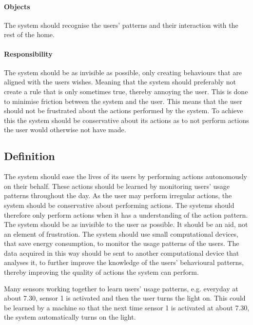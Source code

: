 \paragraph{Objects}
The system should recognise the users' patterns and their interaction with the rest of the home.

\paragraph{Responsibility}
The system should be as invisible as possible, only creating behaviours that are aligned with the users wishes. Meaning that the system should preferably not create a rule that is only sometimes true, thereby annoying the user. This is done to minimise friction between the system and the user. This means that the user should not be frustrated about the actions performed by the system. To achieve this the system should be conservative about its actions as to not perform actions the user would otherwise not have made.

\subsection{Definition}
The system should ease the lives of its users by performing actions autonomously on their behalf. These actions should be learned by monitoring users' usage patterns throughout the day. As the user may perform irregular actions, the system should be conservative about performing actions. The systems should therefore only perform actions when it has a understanding of the action pattern. The system should be as invisible to the user as possible. It should be an aid, not an element of frustration. The system should use small computational devices, that save energy consumption, to monitor the usage patterns of the users. The data acquired in this way should be sent to another computational device that analyses it, to further improve the knowledge of the users' behavioural patterns, thereby improving the quality of actions the system can perform.

Many sensors working together to learn users’ usage patterns, e.g. everyday at about 7.30, sensor 1 is activated and then the user turns the light on. This could be learned by a machine so that the next time sensor 1 is activated at about 7.30, the system automatically turns on the light.
